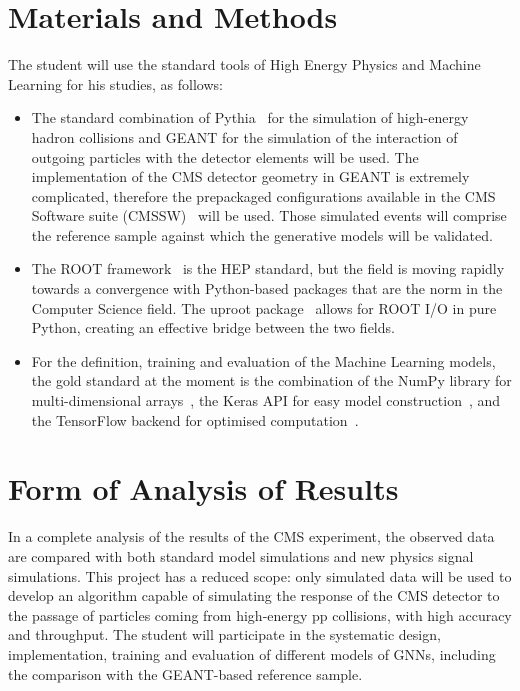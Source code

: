 \documentclass[12pt,a4paper]{sprace}
\begin{document}
\section{Materials and Methods}

The student will use the standard tools of High Energy Physics and Machine Learning for his studies, as follows:
\begin{itemize}
\item The standard combination of Pythia~\cite{sjostrand:2014zea} for the simulation of high-energy hadron collisions and GEANT for the simulation of the interaction of outgoing particles with the detector elements will be used. The implementation of the CMS detector geometry in GEANT is extremely complicated, therefore the prepackaged configurations available in the CMS Software suite (CMSSW)~\cite{ref:cmsswgithub} will be used. Those simulated events will comprise the reference sample against which the generative models will be validated.
\item The ROOT framework~\cite{brun:1996xxx} is the HEP standard, but the field is moving rapidly towards a convergence with Python-based packages that are the norm in the Computer Science field. The uproot package~\cite{pivarski2017uproot} allows for ROOT I/O in pure Python, creating an effective bridge between the two fields.
\item For the definition, training and evaluation of the Machine Learning models, the gold standard at the moment is the combination of the NumPy library for multi-dimensional arrays~\cite{numpy}, the Keras API for easy model construction~\cite{chollet2015keras}, and the TensorFlow backend for optimised computation~\cite{tensorflow2015-whitepaper}.
\end{itemize}

\clearpage

\section{Form of Analysis of Results}

In a complete analysis of the results of the CMS experiment, the observed data are compared with both standard model simulations and new physics signal simulations. This project has a reduced scope: only simulated data will be used to develop an algorithm capable of simulating the response of the CMS detector to the passage of particles coming from high-energy pp collisions, with high accuracy and throughput. The student will participate in the systematic design, implementation, training and evaluation of different models of GNNs, including the comparison with the GEANT-based reference sample.
\end{document}
